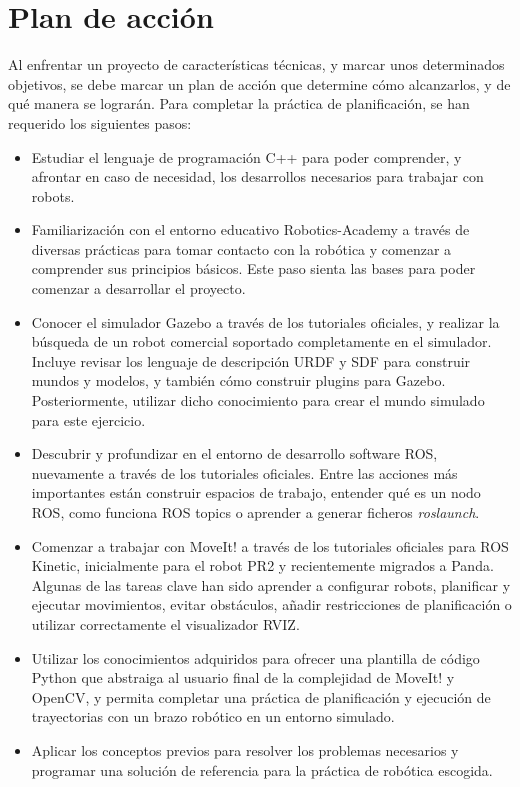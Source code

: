 \documentclass[12pt,spanish,chapterprefix, numbers=noenddot]{book}
\numberwithin{equation}{section}
\numberwithin{figure}{section}
\begin{document}
\section{Plan de acción}
Al enfrentar un proyecto de características técnicas, y marcar unos determinados objetivos, se debe marcar un plan de acción que determine cómo alcanzarlos, y de qué manera se lograrán. Para completar la práctica de planificación, se han requerido los siguientes pasos: 
\begin{itemize}
    \item Estudiar el lenguaje de programación C++ para poder comprender, y afrontar en caso de necesidad, los desarrollos necesarios para trabajar con robots.
    \item Familiarización con el entorno educativo Robotics-Academy a través de diversas prácticas para tomar contacto con la robótica y comenzar a comprender sus principios básicos. Este paso sienta las bases para poder comenzar a desarrollar el proyecto. 
    \item Conocer el simulador Gazebo a través de los tutoriales oficiales, y realizar la búsqueda de un robot comercial soportado completamente en el simulador. Incluye revisar los lenguaje de descripción URDF y SDF para construir mundos y modelos, y también cómo construir plugins para Gazebo. Posteriormente, utilizar dicho conocimiento para crear el mundo simulado para este ejercicio. 
    \item Descubrir y profundizar en el entorno de desarrollo software ROS, nuevamente a través de los tutoriales oficiales. Entre las acciones más importantes están construir espacios de trabajo, entender qué es un nodo ROS, como funciona ROS topics o aprender a generar ficheros \textit{roslaunch}.
    \item Comenzar a trabajar con MoveIt! a través de los tutoriales oficiales para ROS Kinetic, inicialmente para el robot PR2 y recientemente migrados a Panda. Algunas de las tareas clave han sido aprender a configurar robots, planificar y ejecutar movimientos, evitar obstáculos, añadir restricciones de planificación o utilizar correctamente el visualizador RVIZ. 
    \item Utilizar los conocimientos adquiridos para ofrecer una plantilla de código Python que abstraiga al usuario final de la complejidad de MoveIt! y OpenCV, y permita completar una práctica de planificación y ejecución de trayectorias con un brazo robótico en un entorno simulado. 
    \item Aplicar los conceptos previos para resolver los problemas necesarios y programar una solución de referencia para la práctica de robótica escogida.
    
\end{itemize}
\end{document}
